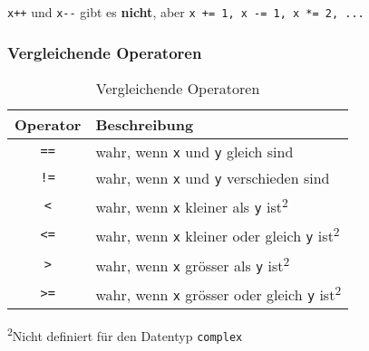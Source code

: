 \begin{achtung}
	\texttt{x++} und \texttt{x-{}-} gibt es \textbf{nicht}, aber \texttt{x += 1, x -= 1, x *= 2, ...}
\end{achtung}
\begin{minipage}[t]{0.5\textwidth}
	\subsubsection{Vergleichende Operatoren}
	\begin{table}[H]
	\begin{threeparttable}
	\caption{Vergleichende Operatoren}
	\begin{tabular}{|c|l|}
		\hline 
		\textbf{Operator} &\textbf{Beschreibung}\\ 
		\hline 
		\texttt{==} &wahr, wenn \texttt{x} und \texttt{y} gleich sind\\ 
		\texttt{!=} &wahr, wenn \texttt{x} und \texttt{y} verschieden sind\\ 
		\texttt{<} &wahr, wenn \texttt{x} kleiner als \texttt{y} ist\textsuperscript{2}\\ 
		\texttt{<=} &wahr, wenn \texttt{x} kleiner oder gleich \texttt{y} ist\textsuperscript{2}\\ 
		\texttt{>} &wahr, wenn \texttt{x} grösser als \texttt{y} ist\textsuperscript{2}\\ 
		\texttt{>=} &wahr, wenn \texttt{x} grösser oder gleich \texttt{y} ist\textsuperscript{2}\\ 
		\hline 
	\end{tabular}
	\textsuperscript{2}Nicht definiert für den Datentyp \texttt{complex}\\
	\end{threeparttable}
	\end{table}
\end{minipage}
